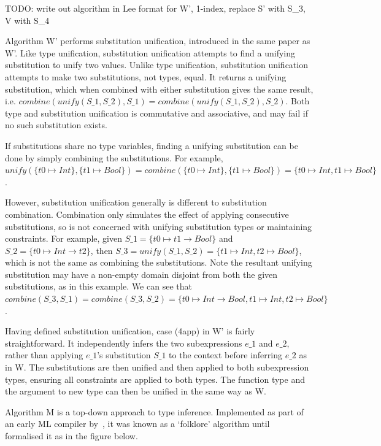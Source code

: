 \documentclass[a4paper,fleqn,12pt]{article}
\begin{document}
TODO: write out algorithm in Lee format for W’, 1-index, replace S’ with S\_3, V with S\_4

Algorithm W’ performs substitution unification, introduced in the same paper as W’. Like type unification, substitution unification attempts to find a unifying substitution to unify two values. Unlike type unification, substitution unification attempts to make two substitutions, not types, equal. It returns a unifying substitution, which when combined with either substitution gives the same result, i.e. $combine(unify(S\_1, S\_2), S\_1) = combine(unify(S\_1, S\_2), S\_2)$. Both type and substitution unification is commutative and associative, and may fail if no such substitution exists.

If substitutions share no type variables, finding a unifying substitution can be done by simply combining the substitutions. For example, $unify(\{ t0 \mapsto Int \}, \{ t1 \mapsto Bool \}) = combine(\{ t0 \mapsto Int \}, \{ t1 \mapsto Bool \}) = \{ t0 \mapsto Int, t1 \mapsto Bool \}$.

However, substitution unification generally is different to substitution combination. Combination only simulates the effect of applying consecutive substitutions, so is not concerned with unifying substitution types or maintaining constraints. For example, given $S\_1 = \{ t0 \mapsto t1 \rightarrow Bool \}$ and $S\_2 = \{ t0 \mapsto Int \rightarrow t2 \}$, then $S\_3 = unify(S\_1, S\_2) = \{ t1 \mapsto Int, t2 \mapsto Bool \}$, which is not the same as combining the substitutions. Note the resultant unifying substitution may have a non-empty domain disjoint from both the given substitutions, as in this example. We can see that $combine(S\_3, S\_1) = combine(S\_3, S\_2) = \{ t0 \mapsto Int \rightarrow Bool, t1 \mapsto Int, t2 \mapsto Bool \}$.

Having defined substitution unification, case (4app) in W’ is fairly straightforward. It independently infers the two subexpressions $e\_1$ and $e\_2$, rather than applying $e\_1$’s substitution $S\_1$ to the context before inferring $e\_2$ as in W. The substitutions are then unified and then applied to both subexpression types, ensuring all constraints are applied to both types. The function type and the argument to new type can then be unified in the same way as W.

Algorithm M is a top-down approach to type inference. Implemented as part of an early ML compiler by~\cite{ref32}, it was known as a ‘folklore’ algorithm until~\cite{ref33} formalised it as in the figure below.
\end{document}
